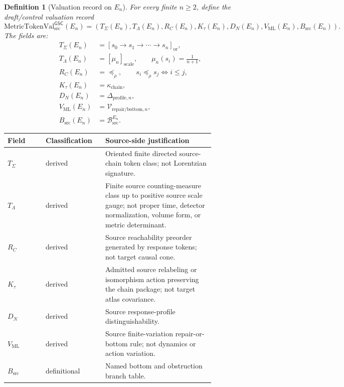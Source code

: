 \documentclass[11pt]{article}
\newcommand{\MetricTokenVal}{\mathrm{MetricTokenVal}_{\mathrm{src}}^{\mathsf{GSC}}}
\newcommand{\En}{E_n}
\newtheorem{definition}{Definition}
\begin{document}
\begin{definition}[Valuation record on \(\En\)]
For every finite \(n\ge 2\), define the draft/control valuation record
\[
\MetricTokenVal(\En)=
(T_{\Sigma}(\En),T_{\Lambda}(\En),R_C(\En),K_{\tau}(\En),
D_N(\En),V_{\mathrm{ML}}(\En),B_{\mathrm{src}}(\En)).
\]
The fields are:
\[
\begin{aligned}
T_{\Sigma}(\En) &= [s_0\to s_1\to\cdots\to s_n]_{\mathrm{or}},\\
T_{\Lambda}(\En) &= [\mu_n]_{\mathrm{scale}},\qquad
  \mu_n(s_i)=\frac{1}{n+1},\\
R_C(\En) &= \preceq_{\rho},\qquad
  s_i\preceq_{\rho}s_j \Longleftrightarrow i\le j,\\
K_{\tau}(\En) &= \kappa_{\mathrm{chain}},\\
D_N(\En) &= \Delta_{\mathrm{profile},n},\\
V_{\mathrm{ML}}(\En) &= \mathcal{V}_{\mathrm{repair}/\mathrm{bottom},n},\\
B_{\mathrm{src}}(\En) &= \mathcal{B}_{\mathrm{src}}^{\En}.
\end{aligned}
\]
\end{definition}

\begin{longtable}{p{0.16\linewidth}p{0.20\linewidth}p{0.46\linewidth}}
\toprule
Field & Classification & Source-side justification \\
\midrule
\(T_{\Sigma}\) & derived &
Oriented finite directed source-chain token class; not Lorentzian signature. \\
\(T_{\Lambda}\) & derived &
Finite source counting-measure class up to positive source scale gauge; not
proper time, detector normalization, volume form, or metric determinant. \\
\(R_C\) & derived &
Source reachability preorder generated by response tokens; not target causal
cone. \\
\(K_{\tau}\) & derived &
Admitted source relabeling or isomorphism action preserving the chain package;
not target atlas covariance. \\
\(D_N\) & derived &
Source response-profile distinguishability. \\
\(V_{\mathrm{ML}}\) & derived &
Source finite-variation repair-or-bottom rule; not dynamics or action
variation. \\
\(B_{\mathrm{src}}\) & definitional &
Named bottom and obstruction branch table. \\
\bottomrule
\end{longtable}
\end{document}

